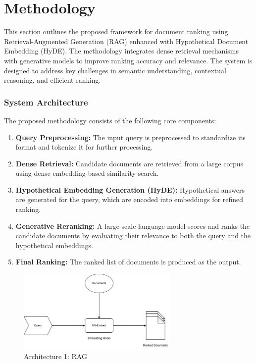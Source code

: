 \chapter{Methodology}
\label{C3} %
\clearpage

This section outlines the proposed framework for document ranking using Retrieval-Augmented Generation (RAG)\cite{rag} enhanced with Hypothetical Document Embedding (HyDE)\cite{hyde}. The methodology integrates dense retrieval mechanisms with generative models to improve ranking accuracy and relevance. The system is designed to address key challenges in semantic understanding, contextual reasoning, and efficient ranking.

\subsection{System Architecture}
The proposed methodology consists of the following core components:
\begin{enumerate}
    \item \textbf{Query Preprocessing:} The input query is preprocessed to standardize its format and tokenize it for further processing.
    \item \textbf{Dense Retrieval:} Candidate documents are retrieved from a large corpus using dense embedding-based similarity search.
    \item \textbf{Hypothetical Embedding Generation (HyDE):} Hypothetical answers are generated for the query, which are encoded into embeddings for refined ranking.
    \item \textbf{Generative Reranking:} A large-scale language model scores and ranks the candidate documents by evaluating their relevance to both the query and the hypothetical embeddings.
    \item \textbf{Final Ranking:} The ranked list of documents is produced as the output.
\end{enumerate}

\begin{figure}[ht]
    \centering
    \includegraphics[width=0.7\textwidth]{IMAGE/RAG_archi.png}
    \caption{Architecture 1: RAG}
    \label{fig:rag_architecture}
\end{figure}

